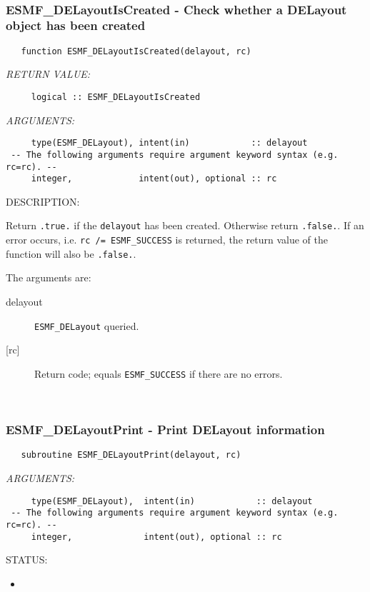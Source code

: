  
\mbox{}\hrulefill\ 
 
\subsubsection [ESMF\_DELayoutIsCreated] {ESMF\_DELayoutIsCreated - Check whether a DELayout object has been created}


 
\begin{verbatim}   function ESMF_DELayoutIsCreated(delayout, rc)\end{verbatim}{\em RETURN VALUE:}
\begin{verbatim}     logical :: ESMF_DELayoutIsCreated\end{verbatim}{\em ARGUMENTS:}
\begin{verbatim}     type(ESMF_DELayout), intent(in)            :: delayout
 -- The following arguments require argument keyword syntax (e.g. rc=rc). --
     integer,             intent(out), optional :: rc
 \end{verbatim}
{\sf DESCRIPTION:\\ }


     Return {\tt .true.} if the {\tt delayout} has been created. Otherwise return 
     {\tt .false.}. If an error occurs, i.e. {\tt rc /= ESMF\_SUCCESS} is 
     returned, the return value of the function will also be {\tt .false.}.
  
   The arguments are:
     \begin{description}
     \item[delayout]
       {\tt ESMF\_DELayout} queried.
     \item[{[rc]}]
       Return code; equals {\tt ESMF\_SUCCESS} if there are no errors.
     \end{description}
   
 
\mbox{}\hrulefill\ 
 
\subsubsection [ESMF\_DELayoutPrint] {ESMF\_DELayoutPrint - Print DELayout information}


 
\begin{verbatim}   subroutine ESMF_DELayoutPrint(delayout, rc)\end{verbatim}{\em ARGUMENTS:}
\begin{verbatim}     type(ESMF_DELayout),  intent(in)            :: delayout
 -- The following arguments require argument keyword syntax (e.g. rc=rc). --
     integer,              intent(out), optional :: rc  \end{verbatim}
{\sf STATUS:}
   \begin{itemize}
   \item{}
   \end{itemize}
  
